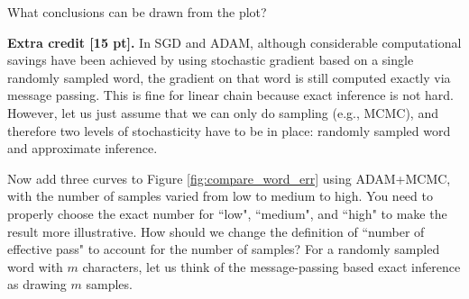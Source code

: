 \documentclass[11pt]{report}
\begin{document}
What conclusions can be drawn from the plot?

{\bf Extra credit [15 pt].} 
In SGD and ADAM, although considerable computational savings have been achieved by using stochastic gradient based on a single randomly sampled word,
the gradient on that word is still computed exactly via message passing.
This is fine for linear chain because exact inference is not hard.
However, let us just assume that we can only do sampling (e.g., MCMC),
and therefore two levels of stochasticity have to be in place: 
randomly sampled word and approximate inference.

Now add three curves to Figure \ref{fig:compare_word_err} using ADAM+MCMC,
with the number of samples varied from low to medium to high.
You need to properly choose the exact number for ``low", ``medium", and ``high" to make the result more illustrative.
How should we change the definition of ``number of effective pass" to account for the number of samples?
For a randomly sampled word with $m$ characters, 
let us think of the message-passing based exact inference as drawing $m$ samples.
\end{document}
